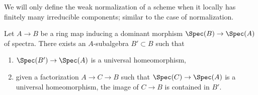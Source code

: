 \noindent
We will only define the weak normalization of a scheme when
it locally has finitely many irreducible components; similar
to the case of normalization.

\begin{lemma}
\label{lemma-relative-weak-normalization-algebra}
Let $A \to B$ be a ring map inducing a dominant morphism
$\Spec(B) \to \Spec(A)$ of spectra. There exists an $A$-subalgebra
$B' \subset B$ such that
\begin{enumerate}
\item $\Spec(B') \to \Spec(A)$ is a universal homeomorphism,
\item given a factorization $A \to C \to B$ such that
$\Spec(C) \to \Spec(A)$ is a universal homeomorphism, the
image of $C \to B$ is contained in $B'$.
\end{enumerate}
\end{lemma}

